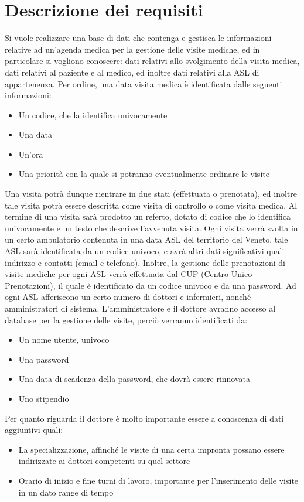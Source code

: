 \documentclass{report}
\begin{document}
\section*{Descrizione dei requisiti}
Si vuole realizzare una base di dati che contenga e gestisca le informazioni relative ad un'agenda medica per la gestione delle visite mediche, ed in particolare si vogliono conoscere: dati relativi allo svolgimento della visita medica, dati relativi al paziente e al medico, ed inoltre dati relativi alla ASL di appartenenza. Per ordine, una data visita medica è identificata dalle seguenti informazioni:
\begin{itemize}
\item Un codice, che la identifica univocamente
\item Una data
\item Un'ora
\item Una priorità con la quale si potranno eventualmente ordinare le visite
\end{itemize}
Una visita potrà dunque rientrare in due stati (effettuata o prenotata), ed inoltre tale visita potrà essere descritta come visita di controllo o come visita medica. Al termine di una visita sarà prodotto un referto, dotato di codice che lo identifica univocamente e un testo che descrive l'avvenuta visita. Ogni visita verrà svolta in un certo ambulatorio contenuta in una data ASL del territorio del Veneto, tale ASL sarà identificata da un codice univoco, e avrà altri dati significativi quali indirizzo e contatti (email e telefono). Inoltre, la gestione delle prenotazioni di visite mediche per ogni ASL verrà effettuata dal CUP (Centro Unico Prenotazioni), il quale è identificato da un codice univoco e da una password. Ad ogni ASL afferiscono un certo numero di dottori e infermieri, nonché amministratori di sistema. L'amministratore e il dottore avranno accesso al database per la gestione delle visite, perciò verranno identificati da:
\begin{itemize}
\item Un nome utente, univoco
\item Una password
\item Una data di scadenza della password, che dovrà essere rinnovata 
\item Uno stipendio
\end{itemize}
Per quanto riguarda il dottore è molto importante essere a conoscenza di dati aggiuntivi quali:
\begin{itemize}
\item La specializzazione, affinché le visite di una certa impronta possano essere indirizzate ai dottori competenti su quel settore
\item Orario di inizio e fine turni di lavoro, importante per l'inserimento delle visite in un dato range di tempo
\end{itemize}
\end{document}
